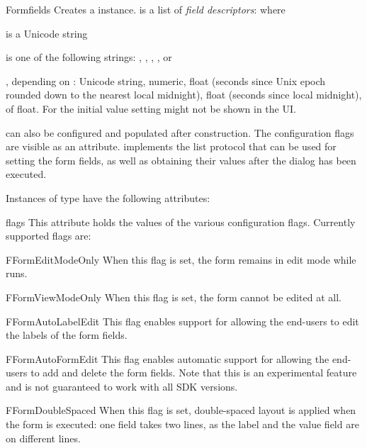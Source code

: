 \begin{classdesc}{Form}{fields}
Creates a  instance.
 is a list of \emph{field descriptors}:  where

 is a Unicode string

 is one of the following strings: 
, , , , 
or 

, depending on : Unicode string, numeric, float (seconds 
since Unix epoch rounded down to the nearest local midnight), float (seconds 
since local midnight),  of float. For 
  the initial value setting might not be shown in the 
UI.
\end{classdesc}

 can also be configured and populated after construction. The 
configuration flags are visible as an attribute.  implements 
the list protocol that can be used for setting the form fields, as well as 
obtaining their values after the dialog has been executed.

Instances of  type have the following attributes:

\begin{memberdesc}[Form]{flags}
This attribute holds the values of the various configuration flags. 
Currently supported flags are:

\begin{datadesc}{FFormEditModeOnly}
When this flag is set, the form remains in edit mode while  
runs.
\end{datadesc}

\begin{datadesc}{FFormViewModeOnly}
When this flag is set, the form cannot be edited at all.
\end{datadesc}

\begin{datadesc}{FFormAutoLabelEdit}
This flag enables support for allowing the end-users to edit the labels of 
the form fields.
\end{datadesc}

\begin{datadesc}{FFormAutoFormEdit}
This flag enables automatic support for allowing the end-users to add and 
delete the form fields. Note that this is an experimental feature and is not 
guaranteed to work with all SDK versions.
\end{datadesc}

\begin{datadesc}{FFormDoubleSpaced}
When this flag is set, double-spaced layout is applied when the form is 
executed: one field takes two lines, as the label and the value field are on 
different lines.
\end{datadesc}
\end{memberdesc}

